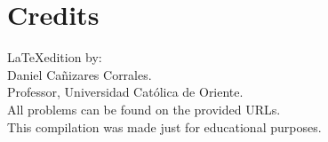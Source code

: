 \documentclass[12pt,a4paper,oneside]{article}
\begin{document}






\newpage
\section*{Credits}
\LaTeX edition by: \\

Daniel Ca\~nizares Corrales. \\
Professor, Universidad Cat\'olica de Oriente. \\

All problems can be found on the provided URLs. \\
This compilation was made just for educational purposes.
\end{document}
